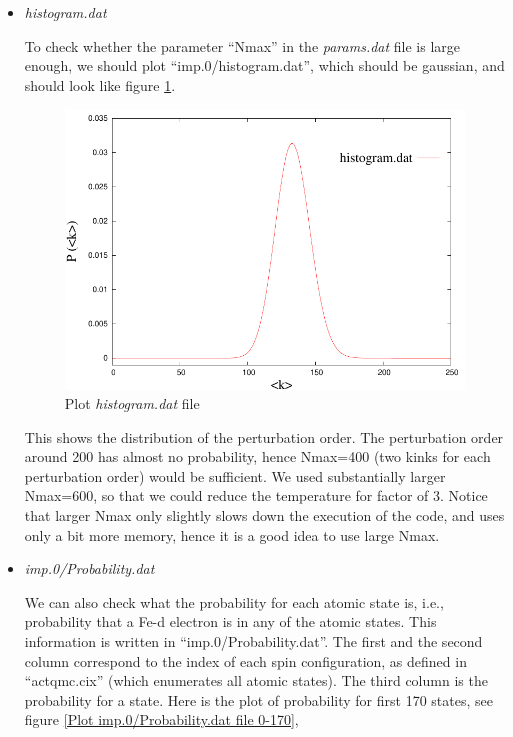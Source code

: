 \documentclass[12 pt]{article}
\begin{document}
  \begin{itemize}

   \item \emph{histogram.dat}

  To check whether the parameter ``Nmax'' in the \emph{params.dat} file is large enough, we should plot 
``imp.0/histogram.dat'', which should be gaussian, and should look like figure \ref{Plot histogram.dat file}.

  \begin{figure}[h]
    \centering
    \captionsetup{justification=centering}
    \caption{Plot \emph{histogram.dat} file}
    \label{Plot histogram.dat file}
    \vspace{2ex}
    \includegraphics[scale=0.8]{gnuplothistogram}
  \end{figure}

  This shows the distribution of the perturbation order. The perturbation order around 200 has almost no probability, 
hence Nmax=400 (two kinks for each perturbation order) would be sufficient. We used substantially larger Nmax=600, 
so that we could reduce the temperature for factor of 3. Notice that larger Nmax only slightly slows down the execution 
of the code, and uses only a bit more memory, hence it is a good idea to use large Nmax.

   \item \emph{imp.0/Probability.dat}

  We can also check what the probability for each atomic state is, i.e., probability that a Fe-d electron is in any 
of the atomic states. This information is written in ``imp.0/Probability.dat''. The first and the second column 
correspond to the index of each spin configuration, as defined in ``actqmc.cix'' (which enumerates all atomic states).
 The third column is the probability for a state. Here is the plot of probability for first 170 states, see figure 
\ref{Plot imp.0/Probability.dat file 0-170},
  

\end{itemize}
\end{document}
